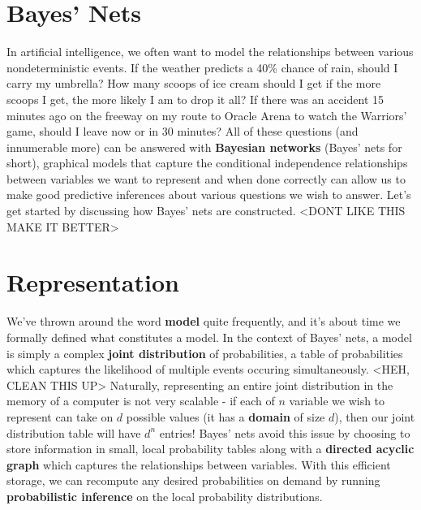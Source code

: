 \documentclass[11pt,fleqn]{article}
\def\title{Note \the\lecturenumber}
\begin{document}
\maketitle


\iffalse
\documentclass[11pt,fleqn]{article}
\usepackage{latexsym,epsf,amsmath,amsfonts,graphicx,url}

\title{Note 6}

\newcommand{\F}{\mathbb{F}}
\newcommand{\Z}{\mathbb{Z}}
\newcommand{\Q}{\mathbb{Q}}
\newcommand{\R}{\mathbb{R}}
\newcommand{\C}{\mathbb{C}}

\begin{document}

\maketitle
\fi

\section*{Bayes' Nets}
In artificial intelligence, we often want to model the relationships between various nondeterministic events. If the weather predicts a 40\% chance of rain, should I carry my umbrella? How many scoops of ice cream should I get if the more scoops I get, the more likely I am to drop it all? If there was an accident 15 minutes ago on the freeway on my route to Oracle Arena to watch the Warriors' game, should I leave now or in 30 minutes? All of these questions (and innumerable more) can be answered with \textbf{Bayesian networks} (Bayes' nets for short), graphical models that capture the conditional independence relationships between variables we want to represent and when done correctly can allow us to make good predictive inferences about various questions we wish to answer. Let's get started by discussing how Bayes' nets are constructed. <DONT LIKE THIS MAKE IT BETTER>

\section*{Representation}
We've thrown around the word \textbf{model} quite frequently, and it's about time we formally defined what constitutes a model. In the context of Bayes' nets, a model is simply a complex \textbf{joint distribution} of probabilities, a table of probabilities which captures the likelihood of multiple events occuring simultaneously. <HEH, CLEAN THIS UP> Naturally, representing an entire joint distribution in the memory of a computer is not very scalable - if each of $n$ variable we wish to represent can take on $d$ possible values (it has a \textbf{domain} of size $d$), then our joint distribution table will have $d^n$ entries! Bayes' nets avoid this issue by choosing to store information in small, local probability tables along with a \textbf{directed acyclic graph} which captures the relationships between variables. With this efficient storage, we can recompute any desired probabilities on demand by running \textbf{probabilistic inference} on the local probability distributions.



\end{document}
\end{document}
